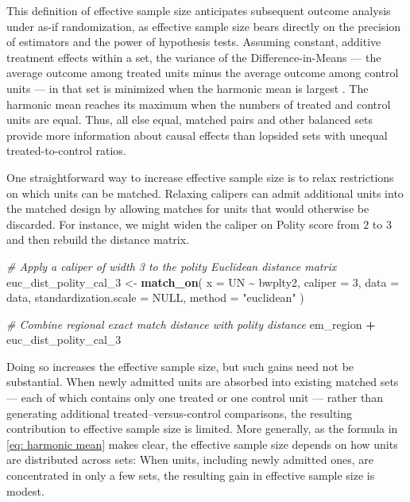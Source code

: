 \documentclass[
  12pt,
  leqno]{article}
\newenvironment{Shaded}{\begin{snugshade}}{\end{snugshade}}
\newcommand{\AttributeTok}[1]{\textcolor[rgb]{0.13,0.29,0.53}{#1}}
\newcommand{\CommentTok}[1]{\textcolor[rgb]{0.56,0.35,0.01}{\textit{#1}}}
\newcommand{\ConstantTok}[1]{\textcolor[rgb]{0.56,0.35,0.01}{#1}}
\newcommand{\DecValTok}[1]{\textcolor[rgb]{0.00,0.00,0.81}{#1}}
\newcommand{\FunctionTok}[1]{\textcolor[rgb]{0.13,0.29,0.53}{\textbf{#1}}}
\newcommand{\NormalTok}[1]{#1}
\newcommand{\OtherTok}[1]{\textcolor[rgb]{0.56,0.35,0.01}{#1}}
\newcommand{\SpecialCharTok}[1]{\textcolor[rgb]{0.81,0.36,0.00}{\textbf{#1}}}
\newcommand{\StringTok}[1]{\textcolor[rgb]{0.31,0.60,0.02}{#1}}
\begin{document}
This definition of effective sample size anticipates subsequent outcome
analysis under as-if randomization, as effective sample size bears
directly on the precision of estimators and the power of hypothesis
tests. Assuming constant, additive treatment effects within a set, the
variance of the Difference-in-Means --- the average outcome among
treated units minus the average outcome among control units --- in that
set is minimized when the harmonic mean is largest
\citep{hansenbowers2008, hansen2011}. The harmonic mean reaches its
maximum when the numbers of treated and control units are equal. Thus,
all else equal, matched pairs and other balanced sets provide more
information about causal effects than lopsided sets with unequal
treated-to-control ratios.

One straightforward way to increase effective sample size is to relax
restrictions on which units can be matched. Relaxing calipers can admit
additional units into the matched design by allowing matches for units
that would otherwise be discarded. For instance, we might widen the
caliper on Polity score from \(2\) to \(3\) and then rebuild the
distance matrix.

\singlespacing

\begin{Shaded}
\begin{Highlighting}[]
\CommentTok{\# Apply a caliper of width 3 to the polity Euclidean distance matrix}
\NormalTok{euc\_dist\_polity\_cal\_3 }\OtherTok{\textless{}{-}} \FunctionTok{match\_on}\NormalTok{(}
  \AttributeTok{x =}\NormalTok{ UN }\SpecialCharTok{\textasciitilde{}}\NormalTok{ bwplty2,}
  \AttributeTok{caliper =} \DecValTok{3}\NormalTok{,}
  \AttributeTok{data =}\NormalTok{ data,}
  \AttributeTok{standardization.scale =} \ConstantTok{NULL}\NormalTok{,}
  \AttributeTok{method =} \StringTok{"euclidean"}
\NormalTok{)}

\CommentTok{\# Combine regional exact match distance with polity distance}
\NormalTok{em\_region }\SpecialCharTok{+}\NormalTok{ euc\_dist\_polity\_cal\_3}
\end{Highlighting}
\end{Shaded}

\doublespacing

Doing so increases the effective sample size, but such gains need not be
substantial. When newly admitted units are absorbed into existing
matched sets --- each of which contains only one treated or one control
unit --- rather than generating additional treated--versus-control
comparisons, the resulting contribution to effective sample size is
limited. More generally, as the formula in \eqref{eq: harmonic mean}
makes clear, the effective sample size depends on how units are
distributed across sets: When units, including newly admitted ones, are
concentrated in only a few sets, the resulting gain in effective sample
size is modest.
\end{document}
